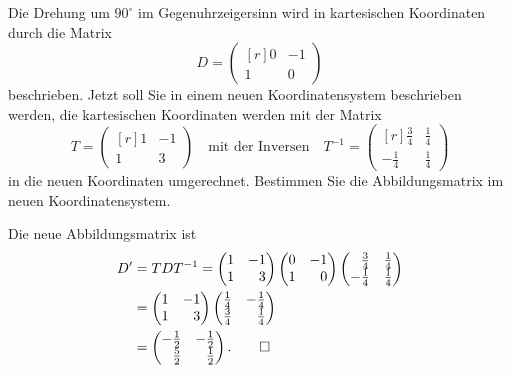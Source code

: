 Die Drehung um $90^\circ$ im Gegenuhrzeigersinn wird in kartesischen
Koordinaten durch die Matrix
\[
\renewcommand{\arraystretch}{1.2}
D
=
\begin{pmatrix*}[r]
0&-1\\
1& 0
\end{pmatrix*}
\]
beschrieben.
Jetzt soll Sie in einem neuen Koordinatensystem beschrieben werden,
die kartesischen Koordinaten werden mit der Matrix
\[
\renewcommand{\arraystretch}{1.2}
T
=
\begin{pmatrix*}[r]
1&-1\\
1& 3
\end{pmatrix*}
\quad\text{mit der Inversen}\quad
T^{-1}
=
\begin{pmatrix*}[r]
 \frac34&\frac14\\
-\frac14&\frac14
\end{pmatrix*}
\]
in die neuen Koordinaten umgerechnet.
Bestimmen Sie die Abbildungsmatrix im neuen Koordinatensystem.

\begin{loesung}
Die neue Abbildungsmatrix ist
\renewcommand{\arraystretch}{1.2}
\begin{align*}
D'
&=
TDT^{-1}
=
\begin{pmatrix*}[r]
1&-1\\
1& 3
\end{pmatrix*}
\begin{pmatrix*}[r]
0&-1\\
1& 0
\end{pmatrix*}
\begin{pmatrix*}[r]
 \frac34&\frac14\\
-\frac14&\frac14
\end{pmatrix*}
\\
&=
\begin{pmatrix*}[r]
1&-1\\
1& 3
\end{pmatrix*}
\begin{pmatrix*}[r]
\frac14&-\frac14\\
\frac34& \frac14
\end{pmatrix*}
\\
&=
\begin{pmatrix*}[r]
-\frac12&-\frac12\\
\frac52&\frac12
\end{pmatrix*}.
\qedhere
\end{align*}
\end{loesung}
